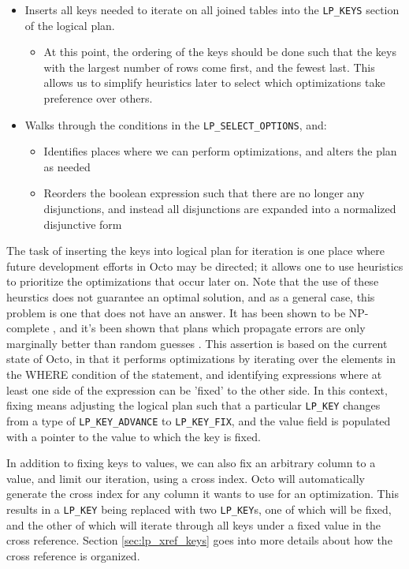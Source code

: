 \documentclass[]{article}
\def\code#1{\texttt{#1}}
\begin{document}
\begin{itemize}
	\item Inserts all keys needed to iterate on all joined tables into the \code{LP\_KEYS} section of the logical plan.
	\begin{itemize}
		\item At this point, the ordering of the keys should be done such that the keys with the largest number of rows come first, and the fewest last. This allows us to simplify heuristics later to select which optimizations take preference over others.
	\end{itemize}
	\item Walks through the conditions in the \code{LP\_SELECT\_OPTIONS}, and:
	\begin{itemize}
		\item Identifies places where we can perform optimizations, and alters the plan as needed
		\item Reorders the boolean expression such that there are no longer any disjunctions, and instead all disjunctions are expanded into a normalized disjunctive form
	\end{itemize}
\end{itemize}

The task of inserting the keys into logical plan for iteration is one place where future development efforts in Octo may be directed; it allows one to use heuristics to prioritize the optimizations that occur later on.
Note that the use of these heurstics does not guarantee an optimal solution, and as a general case, this problem is one that does not have an answer.
It has been shown to be NP-complete \cite{cook_complexity_1971}, and it's been shown that plans which propagate errors are only marginally better than random guesses \cite{ioannidis_propagation_1991}.
This assertion is based on the current state of Octo, in that it performs optimizations by iterating over the elements in the WHERE condition of the statement, and identifying expressions where at least one side of the expression can be 'fixed' to the other side.
In this context, fixing means adjusting the logical plan such that a particular \code{LP\_KEY} changes from a type of \code{LP\_KEY\_ADVANCE} to \code{LP\_KEY\_FIX}, and the value field is populated with a pointer to the value to which the key is fixed.

In addition to fixing keys to values, we can also fix an arbitrary column to a value, and limit our iteration, using a cross index.
Octo will automatically generate the cross index for any column it wants to use for an optimization.
This results in a \code{LP\_KEY} being replaced with two \code{LP\_KEY}s, one of which will be fixed, and the other of which will iterate through all keys under a fixed value in the cross reference.
Section \ref{sec:lp_xref_keys} goes into more details about how the cross reference is organized.
\end{document}
